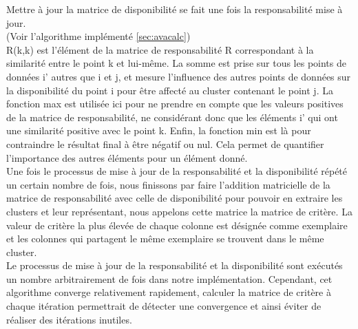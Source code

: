 \begin{appendix}
    Mettre à jour la matrice de disponibilité se fait une fois la responsabilité mise à jour. \\ 
    (Voir l'algorithme implémenté \ref{sec:avacalc})\\
    R(k,k) est l'élément de la matrice de responsabilité R correspondant à la similarité entre le point k et lui-même. La somme est prise sur tous les points de données i' autres que i et j, et mesure l'influence des autres points de données sur la disponibilité du point i pour être affecté au 
    cluster contenant le point j. La fonction max est utilisée ici pour ne prendre en compte que les valeurs positives de la matrice de responsabilité, ne considérant donc que les éléments i' qui ont une similarité positive avec le point k. Enfin, la fonction min est là pour contraindre le résultat final à être négatif ou nul. Cela permet de quantifier l'importance des autres éléments pour un élément donné.\\
    \hspace*{13px} Une fois le processus de mise à jour de la responsabilité et la disponibilité répété un certain nombre de fois, nous finissons par faire l'addition matricielle de la matrice de responsabilité avec celle de disponibilité pour pouvoir en extraire les clusters et leur représentant, nous appelons cette matrice la matrice de critère. La valeur de critère la plus élevée de chaque colonne est désignée comme exemplaire et les colonnes qui partagent le même exemplaire se trouvent dans le même cluster.\\
    \hspace*{13px} Le processus de mise à jour de la responsabilité et la disponibilité sont exécutés un nombre arbitrairement de fois dans notre implémentation. Cependant, cet algorithme converge relativement rapidement, calculer la matrice de critère à chaque itération permettrait de détecter une convergence et ainsi éviter de réaliser des itérations inutiles. \\


\end{appendix}
